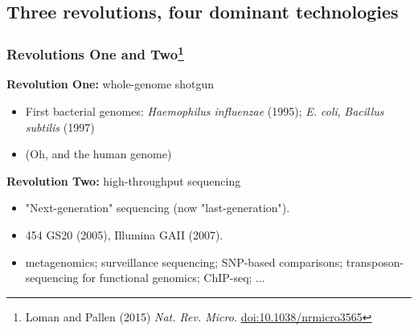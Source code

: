 
\subsection{Three revolutions, four dominant technologies}

\begin{frame}
  \frametitle{Revolutions One and Two\footnote{\tiny{Loman and Pallen (2015) \textit{Nat. Rev. Micro.} \href{http://dx.doi.org/10.1038/nrmicro3565}{doi:10.1038/nrmicro3565}}}}
  \textbf{Revolution One:} whole-genome shotgun
  \begin{itemize}
    \item First bacterial genomes: \textit{Haemophilus influenzae} (1995); \textit{E. coli}, \textit{Bacillus subtilis} (1997)
    \item (Oh, and the human genome)
  \end{itemize}
  \textbf{Revolution Two:} high-throughput sequencing
  \begin{itemize}
    \item "Next-generation" sequencing (now "last-generation").
    \item 454 GS20 (2005), Illumina GAII (2007).
    \item metagenomics; surveillance sequencing; SNP-based comparisons; transposon-sequencing for functional genomics; ChIP-seq; $\ldots$
  \end{itemize}
\end{frame}

